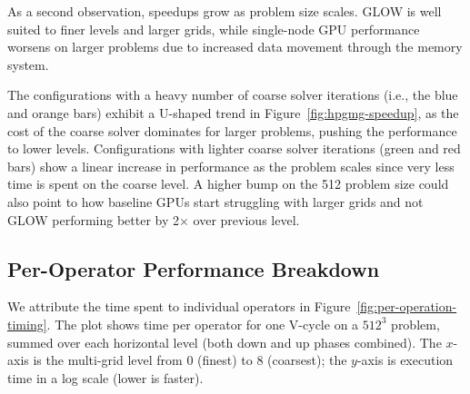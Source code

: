 \documentclass[sigconf]{acmart}
\begin{document}
    As a second observation, speedups grow as problem size scales. GLOW is well suited to finer levels and larger grids, while single-node GPU performance %
    worsens on larger problems due to increased data movement through the memory system. %

The configurations with a heavy number of coarse solver iterations (i.e., the blue and orange bars) exhibit a U-shaped trend in Figure~\ref{fig:hpgmg-speedup}, as the cost of the coarse solver dominates for larger problems, pushing the performance to lower levels. Configurations with lighter coarse solver iterations (green and red bars) show a linear increase in performance as the problem scales since very less time is spent on the coarse level. A higher bump on the 512 problem size could also point to how baseline GPUs start struggling with larger grids and not GLOW performing better by 2$\times$ over previous level.
    
\subsection{Per-Operator Performance Breakdown}
We attribute the time spent to 
individual operators in Figure~\ref{fig:per-operation-timing}. %
The plot shows time per operator for one V-cycle on a $512^3$ problem, summed over each horizontal level (both down and up phases combined). The $x$-axis is the multi-grid level from 0 (finest) to 8 (coarsest); the $y$-axis is execution time in a log scale (lower is faster). %
\end{document}
